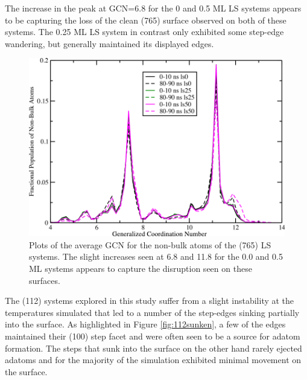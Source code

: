 The increase in the peak at GCN=6.8 for the 0 and 0.5 ML LS systems appears
to be capturing the loss of the clean (765) surface observed on both of these
systems. The 0.25 ML LS system in contrast only exhibited some step-edge
wandering, but generally maintained its displayed edges.

\begin{figure}
\centering
\includegraphics[width=0.9\linewidth]{../figures/appB/765ls_GCNF.pdf}
\caption{Plots of the average GCN for the non-bulk atoms of the  (765)
LS systems. The slight increases seen at 6.8 and 11.8 for the 0.0 and 0.5 ML
systems appears to capture the disruption seen on these surfaces.}
\label{fig:765lsGCN}
\end{figure}
\newpage

The (112) systems explored in this study suffer from a slight instability at
the temperatures simulated that led to a number of the step-edges sinking
partially into the surface. As highlighted in Figure \ref{fig:112sunken}, a few
of the edges maintained their (100) step facet and were often seen to be a
source for adatom formation. The steps that sunk into the surface on the other hand
rarely ejected adatoms and for the majority of the simulation exhibited
minimal movement on the surface.

